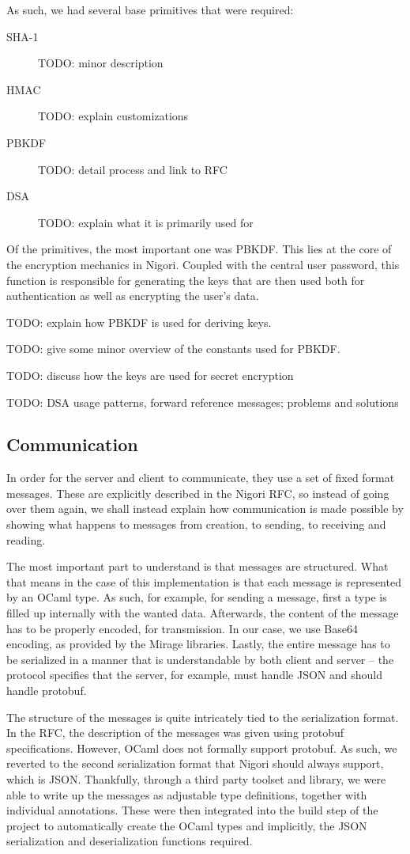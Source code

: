 As such, we had several base primitives that were required:
\begin{description}
  \item[SHA-1] TODO: minor description
  \item[HMAC] TODO: explain customizations
  \item[PBKDF] TODO: detail process and link to RFC
  \item[DSA] TODO: explain what it is primarily used for
\end{description}

Of the primitives, the most important one was PBKDF.
This lies at the core of the encryption mechanics in Nigori.
Coupled with the central user password, this function is responsible for generating the keys that are then used both for authentication as well as encrypting the user's data.

TODO: explain how PBKDF is used for deriving keys.

TODO: give some minor overview of the constants used for PBKDF.

TODO: discuss how the keys are used for secret encryption

TODO: DSA usage patterns, forward reference messages; problems and solutions

\subsection{Communication}
In order for the server and client to communicate, they use a set of fixed format messages.
These are explicitly described in the Nigori RFC, so instead of going over them again, we shall instead explain how communication is made possible by showing what happens to messages from creation, to sending, to receiving and reading.

The most important part to understand is that messages are structured.
What that means in the case of this implementation is that each message is represented by an OCaml type.
As such, for example, for sending a message, first a type is filled up internally with the wanted data.
Afterwards, the content of the message has to be properly encoded, for transmission.
In our case, we use Base64 encoding, as provided by the Mirage libraries.
Lastly, the entire message has to be serialized in a manner that is understandable by both client and server -- the protocol specifies that the server, for example, must handle JSON and should handle protobuf.

The structure of the messages is quite intricately tied to the serialization format.
In the RFC, the description of the messages was given using protobuf specifications.
However, OCaml does not formally support protobuf.
As such, we reverted to the second serialization format that Nigori should always support, which is JSON.
Thankfully, through a third party toolset and library, we were able to write up the messages as adjustable type definitions, together with individual annotations.
These were then integrated into the build step of the project to automatically create the OCaml types and implicitly, the JSON serialization and deserialization functions required.

